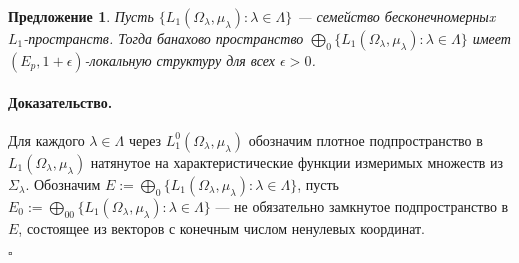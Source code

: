 \documentclass[12pt]{article}
\newtheorem{proposition}[theorem]{Предложение}
\renewenvironment{proof}{\paragraph{Доказательство.}}{\hfill$\square$\medskip}
\begin{document}
\begin{proposition}\label{C0SumOfL1SpHaveDPP} Пусть $\{L_1(\Omega_\lambda,\mu_\lambda):\lambda\in\Lambda\}$ --- семейство бесконечномерныx $L_1$-пространств. Тогда банахово пространство $\bigoplus_0\{L_1(\Omega_\lambda,\mu_\lambda):\lambda\in\Lambda\}$ имеет $(E_p,1+\epsilon)$-локальную структуру для всех $\epsilon>0$.
\end{proposition}
\begin{proof} Для каждого $\lambda\in\Lambda$ через $L_1^0(\Omega_\lambda,\mu_\lambda)$ обозначим плотное подпространство в $L_1(\Omega_\lambda,\mu_\lambda)$ натянутое на характеристические функции измеримых множеств из $\Sigma_\lambda$. Обозначим $E:=\bigoplus_0\{L_1(\Omega_\lambda,\mu_\lambda):\lambda\in\Lambda\}$, пусть $E_0:=\bigoplus_{00}\{L_1(\Omega_\lambda,\mu_\lambda):\lambda\in\Lambda\}$ --- не обязательно замкнутое подпространство в $E$, состоящее из векторов с конечным числом ненулевых координат.


\end{proof}
\end{document}
